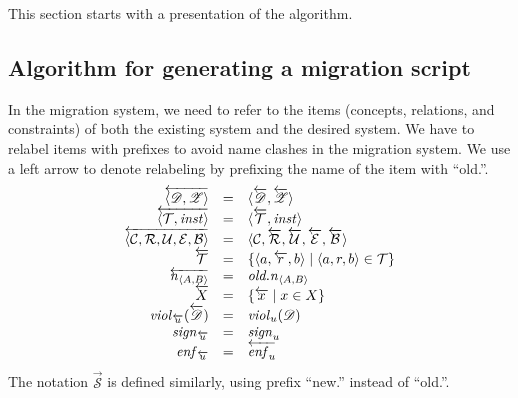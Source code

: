 \documentclass[runningheads]{llncs}
\newcommand{\id}[1]{\text{\it #1\/}}
\newcommand{\instance}{\mathbin{\id{inst}}}
\newcommand{\viol}[2]{\violC{#1}(#2)}
\newcommand{\violC}[1]{\id{viol}_{#1}}
\newcommand{\sign}[1]{\id{sign}_{#1}}
\newcommand{\enfRel}[1]{\id{enf}_{#1}}
\newcommand{\declare}[3]{\id{#1}_{\pair{#2}{#3}}}
\newcommand{\pair}[2]{\langle{#1},{#2}\rangle}
\newcommand{\triple}[3]{\langle{#1},{#2},{#3}\rangle}
\newcommand{\quintuple}[5]{\langle{#1},{#2},{#3},{#4},{#5}\rangle}
\newcommand{\concepts}{\mathcal{C}}
\newcommand{\rels}{\mathcal{R}}   %
\newcommand{\triples}{\mathcal{T}}
\newcommand{\rules}{\mathcal{U}}
\newcommand{\transactions}{\mathcal{E}}
\newcommand{\busConstraints}{\mathcal{B}}
\newcommand{\dataset}{\mathscr{D}}
\newcommand{\schema}{\mathscr{Z}}
\newcommand{\infsys}{\mathscr{S}}
\begin{document}
   This section starts with a presentation of the algorithm.

\subsection{Algorithm for generating a migration script}
   In the migration system, we need to refer to the items (concepts, relations, and constraints) of both the existing system and the desired system.
   We have to relabel items with prefixes to avoid name clashes in the migration system.
   We use a left arrow to denote relabeling by prefixing the name of the item with ``old.''.
\begin{equation}
   \begin{array}[m]{rcl}
      \overleftarrow{\pair{\dataset}{\schema}}&=&\pair{\overleftarrow{\dataset}}{\overleftarrow{\schema}}\\
      \overleftarrow{\pair{\triples}{\instance}}&=&\pair{\overleftarrow{\triples}}{\instance}\\
      \overleftarrow{\quintuple{\concepts}{\rels}{\rules}{\transactions}{\busConstraints}}&=&\quintuple{\concepts}{\overleftarrow{\rels}}{\overleftarrow{\rules}}{\overleftarrow{\transactions}}{\overleftarrow{\busConstraints}}\\
      \overleftarrow{\triples}&=&\{\triple{a}{\overleftarrow{r}}{b}\mid\triple{a}{r}{b}\in\triples\}\\
      \overleftarrow{\declare{n}{A}{B}}&=&\declare{old.n}{A}{B}\\
      \overleftarrow{X}&=&\{\overleftarrow{x}\mid x\in X\}\\
      \viol{\overleftarrow{u}}{\overleftarrow{\dataset}}&=&\viol{u}{\dataset}\\
      \sign{\overleftarrow{u}}&=&\sign{u}\\
      \enfRel{\overleftarrow{u}}&=&\overleftarrow{\enfRel{u}}
   \end{array}
\end{equation}
   The notation $\overrightarrow{\infsys}$ is defined similarly, using prefix ``new.'' instead of ``old.''.
\end{document}
